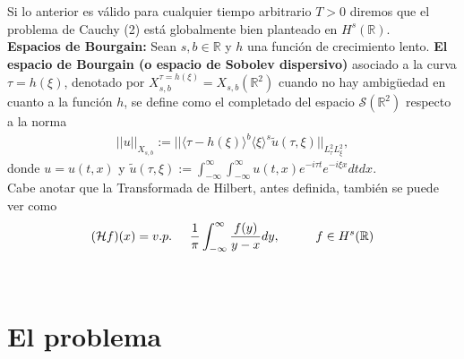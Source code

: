 \documentclass[a0,portrait]{a0poster}
\begin{document}
\begin{multicols}{2}
{{{\begin{minipage}{.93\columnwidth}
Si lo anterior es válido para cualquier tiempo arbitrario $T > 0$ diremos que el problema de Cauchy (2) está globalmente bien planteado en $H^s(\mathbb{R})$.\\


\textbf{Espacios de Bourgain:} Sean $s,b \in \mathbb{R}$ y $h$ una función de crecimiento lento. \textbf{El espacio de Bourgain (o espacio de Sobolev dispersivo)} asociado a la curva $\tau=h(\xi)$, denotado por $X_{s,b}^{\tau=h(\xi)}=X_{s,b}(\mathbb{R}^2)$ cuando no hay ambigüedad en cuanto a la función $h$, se define como el completado del espacio $\mathcal{S}(\mathbb{R}^2)$ respecto a la norma
\begin{align*}
    ||u||_{X_{s,b}}:=||\langle \tau-h(\xi)\rangle^b\langle \xi \rangle^s\widetilde{u}(\tau,\xi)||_{L_\tau^2 L_\xi^2},
\end{align*}
 donde $u=u(t,x)$ y $\displaystyle{\widetilde{u}(\tau,\xi):=\int_{-\infty}^\infty\int_{-\infty}^\infty u(t,x)e^{-i\tau t}e^{-i\xi x}dtdx.}$\\

Cabe anotar que la Transformada de Hilbert, antes definida, también se puede ver como
\begin{align*}
    (\mathcal{H}f)(x)=v.p.\hspace{0.5cm}\dfrac{1}{\pi} \int_{-\infty}^\infty \dfrac{f(y)}{y-x}dy, \hspace{1cm} f \in H^s(\mathbb{R})
\end{align*}
\vspace{0.3cm}
\bigskip
\end{minipage}}}}
\vspace{-1.5cm}\\

\vspace{-1.4cm}
\section{El problema}\label{s:Newton}

{ }
\end{multicols}
\end{document}
